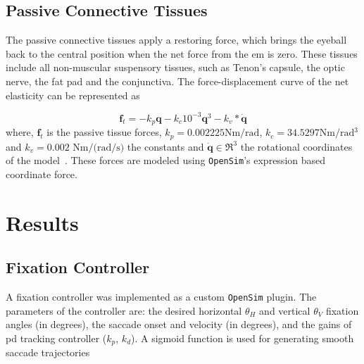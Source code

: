 \documentclass[11pt,a4paper,draft=false]{report}
\renewcommand*{\vec}[1]{\bm{#1}}
\newcommand{\R}[1]{\mathfrak{R}^{#1}}
\newcommand{\inr}[1]{\in\R{#1}}
\begin{document}
\subsection*{Passive Connective Tissues}\label{sec:passive-connective-tissues}

The passive connective tissues apply a restoring force, which brings the eyeball
back to the central position when the net force from the \gls{em} is zero. These
tissues include all non-muscular suspensory tissues, such as Tenon's capsule,
the optic nerve, the fat pad and the conjunctiva. The force-displacement curve
of the net elasticity can be represented as

\begin{equation}\label{equ:passive-tissue}
  \vec{f}_t = -k_p \vec{q} - k_c 10^{-3} \vec{q}^3 - k_v * \vec{\dot{q}}
\end{equation}
%
where, $\vec{f}_t$ is the passive tissue forces,
$k_p= 0.002225 \si{\N \m / \radian}$, $k_c= 34.5297 \si{\N \m / \radian^3}$ and
$k_v= 0.002$ $\si{\N \m / (\radian / \s)}$ the constants and
$\vec{\dot{q}} \inr{3}$ the rotational coordinates of the
model~\cite{Collins1981}. These forces are modeled using \texttt{OpenSim}'s
expression based coordinate force.


\section*{Results}\label{sec:results}

\subsection*{Fixation Controller}\label{sec:fixation-controller}

A fixation controller was implemented as a custom \texttt{OpenSim} plugin. The
parameters of the controller are: the desired horizontal $\theta_H$ and vertical
$\theta_V$ fixation angles (in degrees), the saccade onset and velocity (in
degrees), and the gains of \gls{pd} tracking controller ($k_p$, $k_d $). A
sigmoid function is used for generating smooth saccade trajectories
\end{document}
